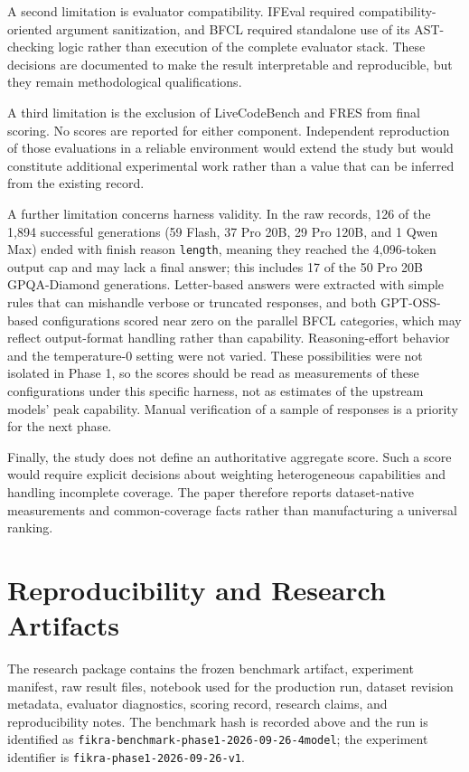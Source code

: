 \documentclass[11pt]{article}
\begin{document}
A second limitation is evaluator compatibility. IFEval required compatibility-oriented argument sanitization, and BFCL required standalone use of its AST-checking logic rather than execution of the complete evaluator stack. These decisions are documented to make the result interpretable and reproducible, but they remain methodological qualifications.

A third limitation is the exclusion of LiveCodeBench and FRES from final scoring. No scores are reported for either component. Independent reproduction of those evaluations in a reliable environment would extend the study but would constitute additional experimental work rather than a value that can be inferred from the existing record.

A further limitation concerns harness validity. In the raw records, 126 of the 1,894 successful generations (59 Flash, 37 Pro 20B, 29 Pro 120B, and 1 Qwen Max) ended with finish reason \texttt{length}, meaning they reached the 4,096-token output cap and may lack a final answer; this includes 17 of the 50 Pro 20B GPQA-Diamond generations. Letter-based answers were extracted with simple rules that can mishandle verbose or truncated responses, and both GPT-OSS-based configurations scored near zero on the parallel BFCL categories, which may reflect output-format handling rather than capability. Reasoning-effort behavior and the temperature-0 setting were not varied. These possibilities were not isolated in Phase 1, so the scores should be read as measurements of these configurations under this specific harness, not as estimates of the upstream models' peak capability. Manual verification of a sample of responses is a priority for the next phase.

Finally, the study does not define an authoritative aggregate score. Such a score would require explicit decisions about weighting heterogeneous capabilities and handling incomplete coverage. The paper therefore reports dataset-native measurements and common-coverage facts rather than manufacturing a universal ranking.

\section{Reproducibility and Research Artifacts}
The research package contains the frozen benchmark artifact, experiment manifest, raw result files, notebook used for the production run, dataset revision metadata, evaluator diagnostics, scoring record, research claims, and reproducibility notes. The benchmark hash is recorded above and the run is identified as \texttt{fikra-benchmark-phase1-2026-09-26-4model}; the experiment identifier is \texttt{fikra-phase1-2026-09-26-v1}.
\end{document}
